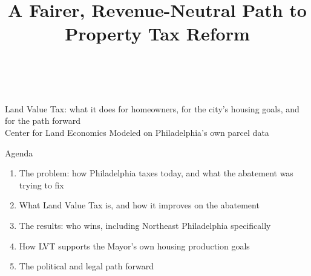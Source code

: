 \documentclass[aspectratio=169,11pt]{beamer}
\title{A Fairer, Revenue-Neutral Path to Property Tax Reform}
\author{}
\date{}
\begin{document}
\begin{darkframe}
\vfill
{\color{deckfg2}}\\[1.0em]
\\[0.5em]
{\large\color{decktint} Land Value Tax: what it does for homeowners, for the city's housing goals, and for the path forward}\\[2.0em]
{\footnotesize\color{deckmuted} Center for Land Economics \quad\textbullet\quad Modeled on Philadelphia's own parcel data}
\vfill
\end{darkframe}

\begin{frame}{Agenda}
\begin{enumerate}
\item The problem: how Philadelphia taxes today, and what the abatement was trying to fix
\item What Land Value Tax is, and how it improves on the abatement
\item The results: who wins, including Northeast Philadelphia specifically
\item How LVT supports the Mayor's own housing production goals
\item The political and legal path forward
\end{enumerate}
\end{frame}
\end{document}
